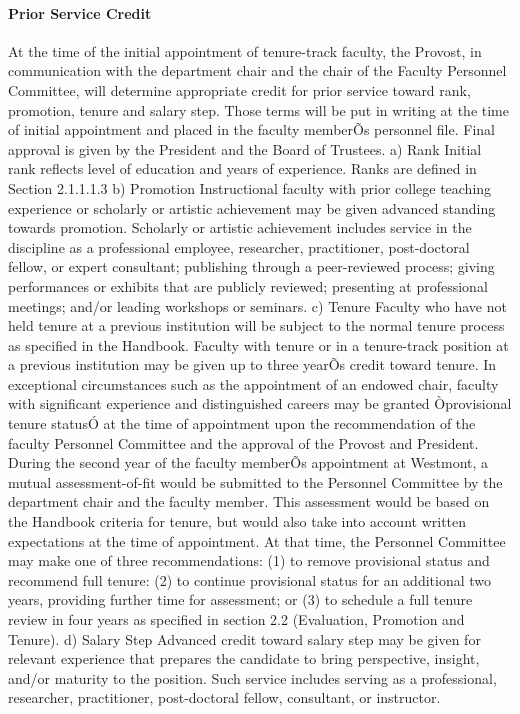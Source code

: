 \documentclass[letterpaper, 11pt]{article}
\begin{document}
			\paragraph{Prior Service Credit}
				At the time of the initial appointment of tenure-track faculty, the Provost, in communication with the department chair and the chair of the Faculty Personnel Committee, will determine appropriate credit for prior service toward rank, promotion, tenure and salary step.  Those terms will be put in writing at the time of initial appointment and placed in the faculty memberÕs personnel file.  Final approval is given by the President and the Board of Trustees.
				a) Rank Initial rank reflects level of education and years of experience.  Ranks are defined in Section 2.1.1.1.3
				b) Promotion Instructional faculty with prior college teaching experience or scholarly or artistic achievement may be given advanced standing towards promotion.  Scholarly or artistic achievement includes service in the discipline as a professional employee, researcher, practitioner, post-doctoral fellow, or expert consultant; publishing through a peer-reviewed process; giving performances or exhibits that are publicly reviewed; presenting at professional meetings; and/or leading workshops or seminars.
				c) Tenure Faculty who have not held tenure at a previous institution will be subject to the normal tenure process as specified in the Handbook.  Faculty with tenure or in a tenure-track position at a previous institution may be given up to three yearÕs credit toward tenure.
				In exceptional circumstances such as the appointment of an endowed chair, faculty with significant experience and distinguished careers may be granted Òprovisional tenure statusÓ at the time of appointment upon the recommendation of the faculty Personnel Committee and the approval of the Provost and President.  During the second year of the faculty memberÕs appointment at Westmont, a mutual assessment-of-fit would be submitted to the Personnel Committee by the department chair and the faculty member.  This assessment would be based on the Handbook criteria for tenure, but would also take into account written expectations at the time of appointment.  At that time, the Personnel Committee may make one of three recommendations: (1) to remove provisional status and recommend full tenure: (2) to continue provisional status for an additional two years, providing further time for assessment; or (3) to schedule a full tenure review in four years as specified in section 2.2 (Evaluation, Promotion and Tenure).
				d)	Salary Step Advanced credit toward salary step may be given for relevant experience that prepares the candidate to bring perspective, insight, and/or maturity to the position.  Such service includes serving as a professional, researcher, practitioner, post-doctoral fellow, consultant, or instructor.
\end{document}
